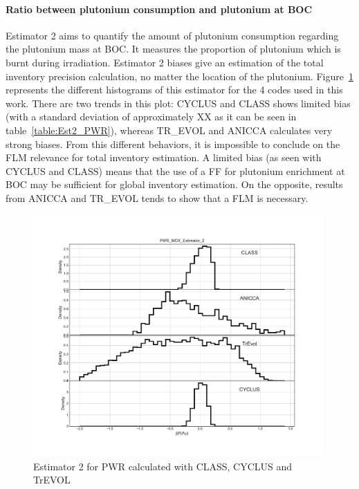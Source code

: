 \paragraph{Ratio between plutonium consumption and plutonium at BOC}

Estimator 2 aims to quantify the amount of plutonium consumption regarding the
plutonium mass at BOC. It measures the proportion of plutonium which is burnt
during irradiation. Estimator 2 biases give an estimation of the total inventory
precision calculation, no matter the location of the plutonium.
Figure~\ref{fig:Est2_PWR} represents the different histograms of this estimator
for the 4 codes used in this work. There are two trends in this plot: CYCLUS and
CLASS shows limited bias (with a standard deviation of approximately XX as it
can be seen in table~\ref{table:Est2_PWR}), whereas TR\_EVOL and ANICCA
calculates very strong biases. From this different behaviors, it is impossible
to conclude on the FLM relevance for total inventory estimation. A limited bias
(as seen with CYCLUS and CLASS) means that the use of a FF for plutonium
enrichment at BOC may be sufficient for global inventory estimation. On the
opposite, results from ANICCA and TR\_EVOL tends to show that a FLM is
necessary. 

\begin{figure}[h]
	\begin{center}
		\includegraphics[width = 0.99\textwidth]{../../Feature_1/RAW_DATA/FIG/PWR_MOX_Estimator_2.pdf}
		\caption{Estimator 2 for PWR calculated with CLASS, CYCLUS and TrEVOL}
		\label{fig:Est2_PWR}
	\end{center}
\end{figure}


